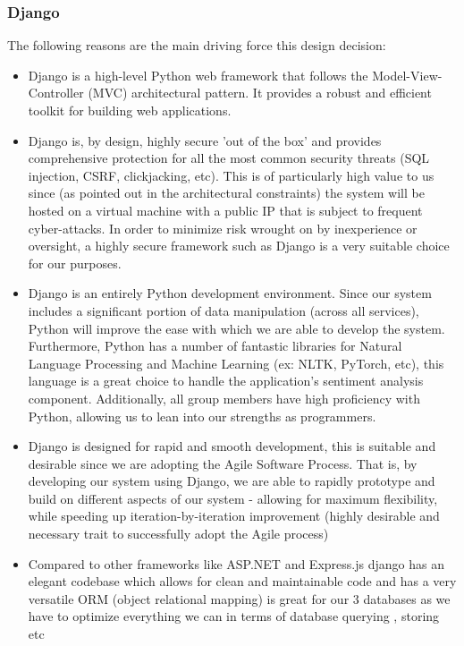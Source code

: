 \documentclass[12pt]{article}
\begin{document}
\subsubsection{Django}
The following reasons are the main driving force this design decision:
\begin{itemize}
    \item Django is a high-level Python web framework that follows the Model-View-Controller (MVC) architectural pattern. It provides a robust and efficient toolkit for building web applications.
\end{itemize}
\begin{itemize}
    \item Django is, by design, highly secure 'out of the box' and provides comprehensive protection for all the most common security threats (SQL injection, CSRF, clickjacking, etc). This is of particularly high value to us since (as pointed out in the architectural constraints) the system will be hosted on a virtual machine with a public IP that is subject to frequent cyber-attacks. In order to minimize risk wrought on by inexperience or oversight, a highly secure framework such as Django is a very suitable choice for our purposes.
    \item Django is an entirely Python development environment. Since our system includes a significant portion of data manipulation (across all services), Python will improve the ease with which we are able to develop the system. Furthermore, Python has a number of fantastic libraries for Natural Language Processing and Machine Learning (ex: NLTK, PyTorch, etc), this language is a great choice to handle the application's sentiment analysis component. Additionally, all group members have high proficiency with Python, allowing us to lean into our strengths as programmers.
    \item Django is designed for rapid and smooth development, this is suitable and desirable since we are adopting the Agile Software Process. That is, by developing our system using Django, we are able to rapidly prototype and build on different aspects of our system - allowing for maximum flexibility, while speeding up iteration-by-iteration improvement (highly desirable and necessary trait to successfully adopt the Agile process)
    \item Compared to other frameworks like ASP.NET and Express.js django has an elegant codebase which allows for clean and maintainable code and has a very versatile ORM (object relational mapping) is great for our 3 databases as we have to optimize everything we can in terms of database querying , storing etc
\end{itemize}
\end{document}
